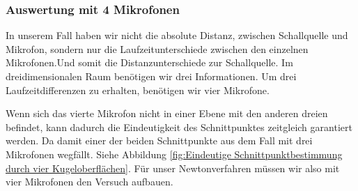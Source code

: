 \subsubsection{Auswertung mit 4 Mikrofonen}
In unserem Fall haben wir nicht die absolute Distanz, zwischen Schallquelle und Mikrofon, sondern nur die Laufzeitunterschiede zwischen den einzelnen Mikrofonen.Und somit die Distanzunterschiede zur Schallquelle. Im dreidimensionalen Raum benötigen wir drei Informationen. Um drei Laufzeitdifferenzen zu erhalten, benötigen wir vier Mikrofone. 

Wenn sich das vierte Mikrofon nicht in einer Ebene mit den anderen dreien befindet, kann dadurch die Eindeutigkeit des Schnittpunktes zeitgleich garantiert werden. Da damit einer der beiden Schnittpunkte aus dem Fall mit drei Mikrofonen wegfällt. Siehe Abbildung \ref{fig:Eindeutige Schnittpunktbestimmung durch vier Kugeloberflächen}. Für unser Newtonverfahren müssen wir also mit vier Mikrofonen den Versuch aufbauen.



\newpage
\pagebreak
